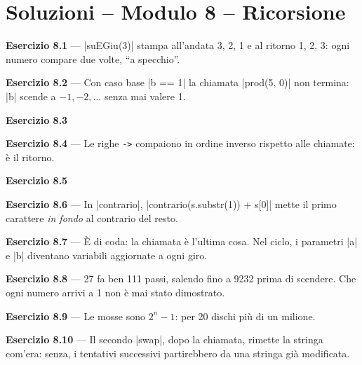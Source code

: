 \chapter{Soluzioni -- Modulo 8 -- Ricorsione}

\textbf{Esercizio 8.1} --- \cc|suEGiu(3)| stampa all'andata 3, 2, 1 e al ritorno
1, 2, 3: ogni numero compare due volte, ``a specchio''.

\textbf{Esercizio 8.2} --- Con caso base \cc|b == 1| la chiamata \cc|prod(5, 0)| non
termina: \cc|b| scende a $-1, -2, \ldots$ senza mai valere 1.

\textbf{Esercizio 8.3}

\textbf{Esercizio 8.4} --- Le righe \texttt{->} compaiono in ordine inverso rispetto
alle chiamate: è il ritorno.

\textbf{Esercizio 8.5}

\textbf{Esercizio 8.6} --- In \cc|contrario|, \cc|contrario(s.substr(1)) + s[0]|
mette il primo carattere \emph{in fondo} al contrario del resto.

\textbf{Esercizio 8.7} --- È di coda: la chiamata è l'ultima cosa. Nel ciclo, i
parametri \cc|a| e \cc|b| diventano variabili aggiornate a ogni giro.

\textbf{Esercizio 8.8} --- 27 fa ben 111 passi, salendo fino a 9232 prima di
scendere. Che ogni numero arrivi a 1 non è mai stato dimostrato.

\textbf{Esercizio 8.9} --- Le mosse sono $2^n - 1$: per 20 dischi più di un milione.

\textbf{Esercizio 8.10} --- Il secondo \cc|swap|, dopo la chiamata, rimette la stringa
com'era: senza, i tentativi successivi partirebbero da una stringa già modificata.

